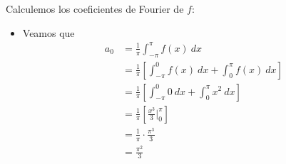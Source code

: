 \documentclass[12pt]{report}
\theoremstyle{largebreak}
\begin{document}
    \begin{sol}
        Calculemos los coeficientes de Fourier de $f$:
        \begin{itemize}
            \item Veamos que
            \begin{equation*}
                \begin{split}
                    a_0&=\frac{1}{\pi}\int_{-\pi}^\pi f(x)\:dx\\
                    &=\frac{1}{\pi}\left[\int_{-\pi}^0 f(x)\:dx+\int_{0}^\pi f(x)\:dx \right]\\
                    &=\frac{1}{\pi}\left[\int_{-\pi}^0 0\:dx+\int_{0}^\pi x^2\:dx\right]\\
                    &=\frac{1}{\pi}\left[\frac{x^3}{3}\Big|_{0}^\pi \right]\\
                    &=\frac{1}{\pi}\cdot\frac{\pi^3}{3}\\
                    &=\frac{\pi^2}{3}\\
                \end{split}
            \end{equation*}


\end{itemize}
\end{sol}
\end{document}
